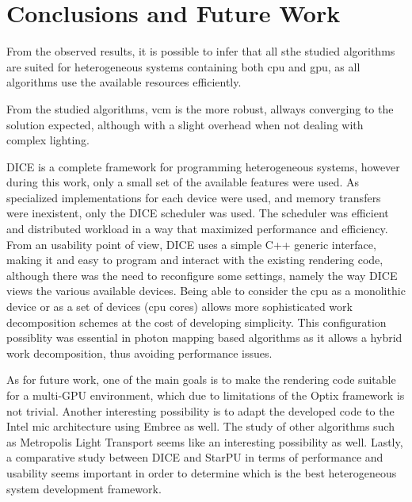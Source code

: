\chapter{Conclusions and Future Work}








From the observed results, it is possible to infer that all sthe studied algorithms are suited for heterogeneous systems containing both \gls{cpu} and \gls{gpu}, as all algorithms use the available resources efficiently.

From the studied algorithms, \gls{vcm} is the more robust, allways converging to the solution expected, although with a slight overhead when not dealing with complex lighting.

DICE is a complete framework for programming heterogeneous systems, however during this work, only a small set of the available features were used. As specialized implementations for each device were used, and memory transfers were inexistent, only the DICE scheduler was used. The scheduler was efficient and distributed workload in a way that maximized performance and efficiency. From an usability point of view, DICE uses a simple C++ generic interface, making it and easy to program and interact with the existing rendering code, although there was the need to reconfigure some settings, namely the way DICE views the various available devices. Being able to consider the \gls{cpu} as a monolithic device or as a set of devices (\gls{cpu} cores) allows more sophisticated work decomposition schemes at the cost of developing simplicity. This configuration possiblity was essential in photon mapping based algorithms as it allows a hybrid work decomposition, thus avoiding performance issues.

As for future work, one of the main goals is to make the rendering code suitable for a multi-GPU environment, which due to limitations of the Optix framework is not trivial. Another interesting possibility is to adapt the developed code to the Intel \gls{mic} architecture using Embree as well. The study of other algorithms such as Metropolis Light Transport seems like an interesting possibility as well. Lastly, a comparative study between DICE and StarPU in terms of performance and usability seems important in order to determine which is the best heterogeneous system development framework.